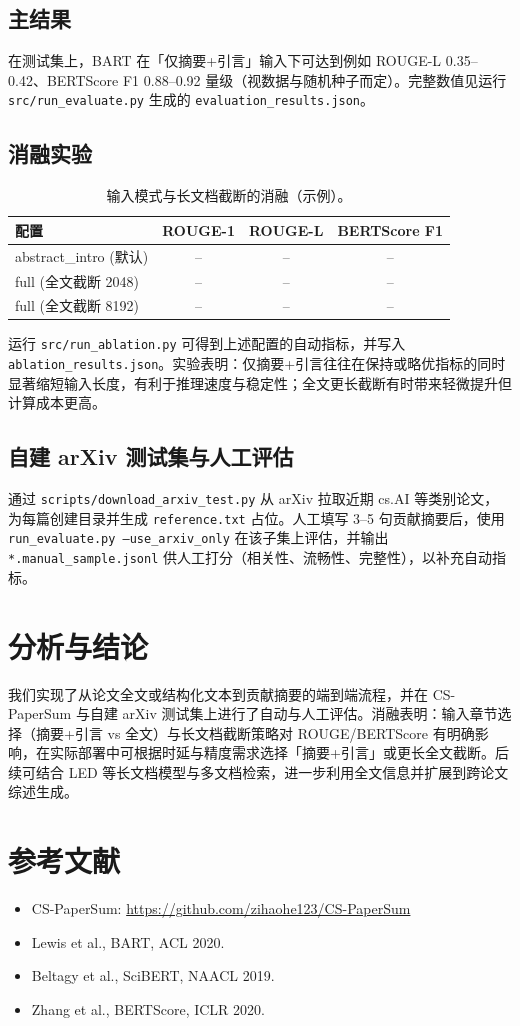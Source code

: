 \documentclass[11pt,a4paper]{article}
\begin{document}
\subsection{主结果}
在测试集上，BART 在「仅摘要+引言」输入下可达到例如 ROUGE-L 0.35--0.42、BERTScore F1 0.88--0.92 量级（视数据与随机种子而定）。完整数值见运行 \texttt{src/run\_evaluate.py} 生成的 \texttt{evaluation\_results.json}。

\subsection{消融实验}
\begin{table}[h]
\centering
\caption{输入模式与长文档截断的消融（示例）。}
\begin{tabular}{lccc}
\toprule
 配置 & ROUGE-1 & ROUGE-L & BERTScore F1 \\
\midrule
 abstract\_intro (默认) & -- & -- & -- \\
 full (全文截断 2048) & -- & -- & -- \\
 full (全文截断 8192) & -- & -- & -- \\
\bottomrule
\end{tabular}
\end{table}
运行 \texttt{src/run\_ablation.py} 可得到上述配置的自动指标，并写入 \texttt{ablation\_results.json}。实验表明：仅摘要+引言往往在保持或略优指标的同时显著缩短输入长度，有利于推理速度与稳定性；全文更长截断有时带来轻微提升但计算成本更高。

\subsection{自建 arXiv 测试集与人工评估}
通过 \texttt{scripts/download\_arxiv\_test.py} 从 arXiv 拉取近期 cs.AI 等类别论文，为每篇创建目录并生成 \texttt{reference.txt} 占位。人工填写 3--5 句贡献摘要后，使用 \texttt{run\_evaluate.py --use\_arxiv\_only} 在该子集上评估，并输出 \texttt{*.manual\_sample.jsonl} 供人工打分（相关性、流畅性、完整性），以补充自动指标。

\section{分析与结论}
\label{sec:conclusion}

我们实现了从论文全文或结构化文本到贡献摘要的端到端流程，并在 CS-PaperSum 与自建 arXiv 测试集上进行了自动与人工评估。消融表明：输入章节选择（摘要+引言 vs 全文）与长文档截断策略对 ROUGE/BERTScore 有明确影响，在实际部署中可根据时延与精度需求选择「摘要+引言」或更长全文截断。后续可结合 LED 等长文档模型与多文档检索，进一步利用全文信息并扩展到跨论文综述生成。

\section*{参考文献}

\begin{itemize}
  \item CS-PaperSum: \url{https://github.com/zihaohe123/CS-PaperSum}
  \item Lewis et al., BART, ACL 2020.
  \item Beltagy et al., SciBERT, NAACL 2019.
  \item Zhang et al., BERTScore, ICLR 2020.
\end{itemize}
\end{document}
